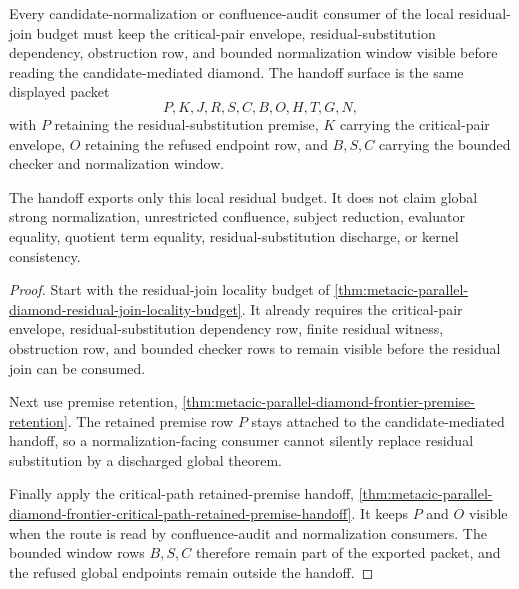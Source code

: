 \begin{theorem}
\label{thm:metacic-parallel-diamond-frontier-residual-budget-handoff}
Every candidate-normalization or confluence-audit consumer of the local residual-join budget must keep the critical-pair envelope, residual-substitution dependency, obstruction row, and bounded normalization window visible before reading the candidate-mediated diamond. The handoff surface is the same displayed packet
$$
P,K,J,R,S,C,B,O,H,T,G,N ,
$$
with $P$ retaining the residual-substitution premise, $K$ carrying the critical-pair envelope, $O$ retaining the refused endpoint row, and $B,S,C$ carrying the bounded checker and normalization window.

The handoff exports only this local residual budget. It does not claim global strong normalization, unrestricted confluence, subject reduction, evaluator equality, quotient term equality, residual-substitution discharge, or kernel consistency.
\end{theorem}
\begin{proof}
Start with the residual-join locality budget of \autoref{thm:metacic-parallel-diamond-residual-join-locality-budget}. It already requires the critical-pair envelope, residual-substitution dependency row, finite residual witness, obstruction row, and bounded checker rows to remain visible before the residual join can be consumed.

Next use premise retention, \autoref{thm:metacic-parallel-diamond-frontier-premise-retention}. The retained premise row $P$ stays attached to the candidate-mediated handoff, so a normalization-facing consumer cannot silently replace residual substitution by a discharged global theorem.

Finally apply the critical-path retained-premise handoff, \autoref{thm:metacic-parallel-diamond-frontier-critical-path-retained-premise-handoff}. It keeps $P$ and $O$ visible when the route is read by confluence-audit and normalization consumers. The bounded window rows $B,S,C$ therefore remain part of the exported packet, and the refused global endpoints remain outside the handoff.
\end{proof}
